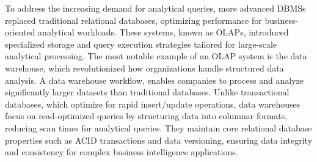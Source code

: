 \smallskip

To address the increasing demand for analytical queries, more advanced \glspl{DBMS} replaced traditional relational databases, optimizing performance for business-oriented analytical workloads. These systems, known as \glspl{OLAP}, introduced specialized storage and query execution strategies tailored for large-scale analytical processing. The most notable example of an \gls{OLAP} system is the data warehouse, which revolutionized how organizations handle structured data analysis. A data warehouse workflow, enables companies to process and analyze significantly larger datasets than traditional databases. Unlike transactional databases, which optimize for rapid insert/update operations, data warehouses focus on read-optimized queries by structuring data into columnar formats, reducing scan times for analytical queries. They maintain core relational database properties such as \gls{ACID} transactions and data versioning, ensuring data integrity and consistency for complex business intelligence applications.  

\smallskip

